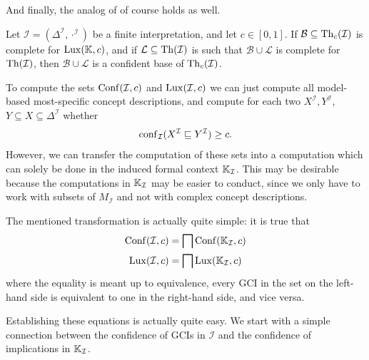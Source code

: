 And finally, the analog of  of course holds as well.

\begin{Corollary}
  \label{cor:weakened-luxenburger-base-for-gcis}
  Let $\mathcal{I} = (\Delta^{\mathcal{I}}, \cdot^{\mathcal{I}})$ be a finite
  interpretation, and let $c \in [0,1]$.  If $\mathcal{B} \subseteq \operatorname{Th}_c(\mathcal{I})$ is
  complete for $\operatorname{Lux}({\mathbb{K}}, c)$, and if $\mathcal{L} \subseteq \operatorname{Th}(\mathcal{I})$ is such
  that $\mathcal{B} \cup \mathcal{L}$ is complete for $\operatorname{Th}(\mathcal{I})$, then
  $\mathcal{B} \cup \mathcal{L}$ is a confident base of $\operatorname{Th}_c(\mathcal{I})$.
\end{Corollary}

To compute the sets $\operatorname{Conf}(\mathcal{I}, c)$ and $\operatorname{Lux}(\mathcal{I}, c)$ we can just compute
all model-based most-specific concept descriptions, and compute for each two
$X^{\mathcal{I}}, Y^{\mathcal{I}}$, $Y \subseteq X \subseteq \Delta^{\mathcal{I}}$ whether
\begin{equation*}
  \operatorname{conf}_{\mathcal{I}}(X^{\mathcal{I}} \sqsubseteq Y^{\mathcal{I}}) \ge c.
\end{equation*}
However, we can transfer the computation of these sets into a computation which can solely
be done in the induced formal context ${\mathbb{K}}_{\mathcal{I}}$.  This may be desirable
because the computations in ${\mathbb{K}}_{\mathcal{I}}$ may be easier to conduct, since we only
have to work with subsets of $M_{\mathcal{I}}$ and not with complex concept descriptions.

The mentioned transformation is actually quite simple: it is true that
\begin{equation}
  \label{eq:31}
  \begin{aligned}
    \operatorname{Conf}(\mathcal{I}, c) &= \bigsqcap \operatorname{Conf}({\mathbb{K}}_{\mathcal{I}}, c) \\
    \operatorname{Lux}(\mathcal{I}, c) &= \bigsqcap \operatorname{Lux}({\mathbb{K}}_{\mathcal{I}}, c)
  \end{aligned}
\end{equation}
where the equality is meant up to equivalence, \ie every GCI in the set on the left-hand
side is equivalent to one in the right-hand side, and vice versa.

Establishing these equations is actually quite easy.  We start with a simple connection
between the confidence of GCIs in $\mathcal{I}$ and the confidence of implications in
${\mathbb{K}}_{\mathcal{I}}$.

